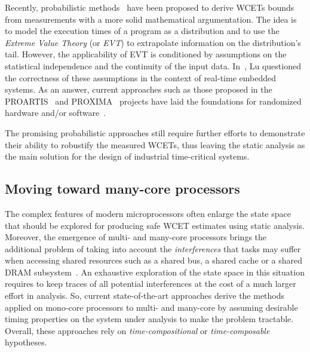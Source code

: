 \documentclass[main.tex]{subfiles}
\begin{document}
Recently, probabilistic methods~\cite{Edgar2001} have been proposed to derive WCETs bounds from measurements with a more solid mathematical argumentation. The idea is to model the execution times of a program as a distribution and to use the \emph{Extreme Value Theory} (or \emph{EVT}) \cite{Embrechts1997} to extrapolate information on the distribution's tail. However, the applicability of EVT is conditioned by assumptions on the statistical independence and the continuity of the input data. In~\cite{Lu2011}, Lu \etal questioned the correctness of these assumptions in the context of real-time embedded systems. As an answer, current approaches such as those proposed in the PROARTIS~\cite{Proartis} and PROXIMA~\cite{Proxima} projects have laid the foundations for randomized hardware and/or software~\cite{BerezovskyiGSBT16,GuetSM16}.

The promising probabilistic approaches still require further efforts to demonstrate their ability to robustify the measured WCETs, thus leaving the static analysis as the main solution for the design of industrial time-critical systems.






\subsection{Moving toward many-core processors}

The complex features of modern microprocessors often enlarge the state space that should be explored for producing safe WCET estimates using static analysis. Moreover, the emergence of multi- and many-core processors brings the additional problem of taking into account the \emph{interferences} that tasks may suffer when accessing shared resources such as a shared bus, a shared cache or a shared DRAM subsystem~\cite{Wilhelm2012}. An exhaustive exploration of the state space in this situation requires to keep traces of all potential interferences at the cost of a much larger effort in analysis. So, current state-of-the-art approaches derive the methods applied on mono-core processors to multi- and many-core by assuming desirable timing properties on the system under analysis to make the problem tractable. Overall, these approaches rely on \emph{time-compositional} or \emph{time-composable} hypotheses. \\
\end{document}
